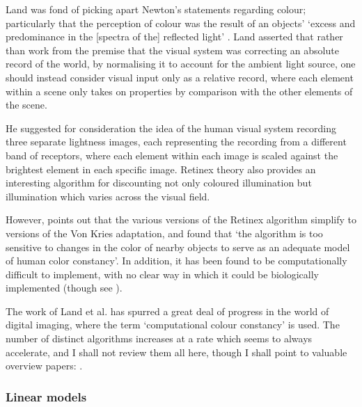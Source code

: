 Land was fond of picking apart Newton's statements regarding colour; particularly that the perception of colour was the result of an objects' `excess and predominance in the [spectra of the] reflected light' \citep{newton_opticks_1704}. Land asserted that rather than work from the premise that the visual system was correcting an absolute record of the world, by normalising it to account for the ambient light source, one should instead consider visual input only as a relative record, where each element within a scene only takes on properties by comparison with the other elements of the scene. 

He suggested for consideration the idea of the human visual system recording three separate lightness images, each representing the recording from a different band of receptors, where each element within each image is scaled against the brightest element in each specific image. Retinex theory also provides an interesting algorithm for discounting not only coloured illumination but illumination which varies across the visual field.

However, \citet{barnard_practical_1999} points out that the various versions of the Retinex algorithm simplify to versions of the Von Kries adaptation, and \citet{brainard_analysis_1986} found that `the algorithm is too sensitive to changes in the color of nearby objects to serve as an adequate model of human color constancy'. In addition, it has been found to be computationally difficult to implement, with no clear way in which it could be biologically implemented (though see \citet{hurlbert_formal_1986}).

The work of Land et al. has spurred a great deal of progress in the world of digital imaging, where the term `computational colour constancy' is used. The number of distinct algorithms increases at a rate which seems to always accelerate, and I shall not review them all here, though I shall point to valuable overview papers:  \citet{hordley_reevaluation_2006, gijsenij_computational_2011, hurlbert_computational_1998}.

\subsubsection{Linear models}

